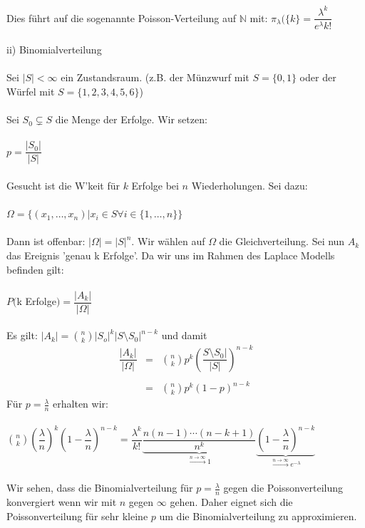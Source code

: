 \documentclass[10pt,a4paper]{report}
\numberwithin{equation}{section}
\numberwithin{figure}{section}
\theoremstyle{plain}
\theoremstyle{definition}
\theoremstyle{plain}
\theoremstyle{definition}
\theoremstyle{remark}
\theoremstyle{plain}
\theoremstyle{plain}
\theoremstyle{plain}
\newcommand{\1}{ \mathbb{1} } %
\begin{document}
Dies führt auf die sogenannte Poisson-Verteilung auf $\mathbb{N}$ mit: $\pi_\lambda(\{k\}=\dfrac{\lambda^k}{e^\lambda k!}$\\\\
ii) Binomialverteilung\\\\
Sei $|S|<\infty$ ein Zustandsraum. (z.B. der Münzwurf mit $S=\{0,1\}$ oder der Würfel mit $S=\{1,2,3,4,5,6\}$)\\\\
Sei $S_0 \subsetneq S$ die Menge der Erfolge. Wir setzen:\\\\
$p=\dfrac{|S_0|}{|S|}$\\\\
Gesucht ist die W'keit für $k$ Erfolge bei $n$ Wiederholungen. Sei  dazu:\\\\
$\Omega=\{(x_1,\dots,x_n)|x_i \in S \forall i \in \{1,\dots,n\}\}$\\\\
Dann ist offenbar: $|\Omega|=|S|^n$. Wir wählen auf $\Omega$ die Gleichverteilung. Sei nun $A_k$ das Ereignis 'genau k Erfolge'. Da wir uns im Rahmen des Laplace Modells befinden gilt:\\\\
$P($k Erfolge$)=\dfrac{|A_k|}{|\Omega|}$\\\\
Es gilt: $|A_k|=\binom{n}{k}|S_o|^k|S\setminus S_0|^{n-k}$ und damit
\begin{eqnarray*}
\dfrac{|A_k|}{|\Omega|}&=&\binom{n}{k}p^k\left(\dfrac{S\setminus S_0|}{|S|}\right)^{n-k}\\\\
&=&\binom{n}{k}p^k(1-p)^{n-k}
\end{eqnarray*}
Für $p=\frac{\lambda}{n}$ erhalten wir:\\\\
$\binom{n}{k}\left(\dfrac{\lambda}{n}\right)^k\left(1-\dfrac{\lambda}{n}\right)^{n-k}=\dfrac{\lambda^k}{k!}\underbrace{\dfrac{n(n-1)\cdots(n-k+1)}{n^k}}_{\overset{n \to \infty}{\rightarrow} 1}\underbrace{\left(1-\dfrac{\lambda}{n}\right)^{n-k}}_{\overset{n \to \infty}{\rightarrow} e^{-\lambda}}$\\\\
Wir sehen, dass die Binomialverteilung für $p=\frac{\lambda}{n}$ gegen die Poissonverteilung konvergiert wenn wir mit $n$ gegen $\infty$ gehen. Daher eignet sich die Poissonverteilung für sehr kleine $p$ um die Binomialverteilung zu approximieren.\\\\\\
\end{document}
